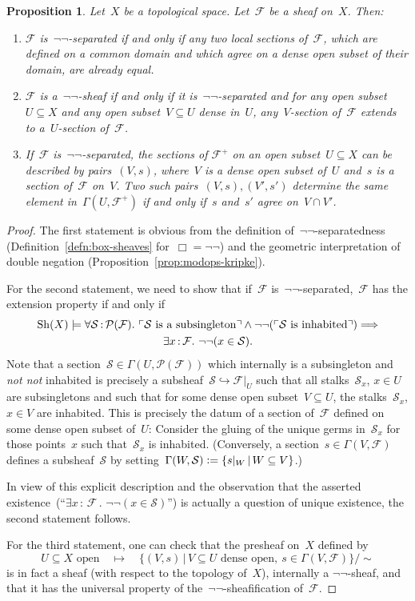 \documentclass[10pt]{amsart}
\theoremstyle{definition}
\theoremstyle{plain}
\newtheorem{prop}[defn]{Proposition}
\theoremstyle{remark}
\newcommand{\F}{\mathcal{F}}
\renewcommand{\P}{\mathcal{P}}
\renewcommand{\S}{\mathcal{S}}
\newcommand{\Sh}{\mathrm{Sh}}
\newcommand{\?}{\,{:}\,}
\renewcommand{\_}{\mathpunct{.}\,}
\newcommand{\speak}[1]{\ulcorner\text{\textnormal{#1}}\urcorner}
\newcommand{\notnot}{\emph{not not}\xspace}
\newcommand{\defeq}{\vcentcolon=}
\begin{document}
\begin{prop}\label{prop:negneg-sheaves}
Let~$X$ be a topological space. Let~$\F$ be a sheaf on~$X$. Then:
\begin{enumerate}
\item $\F$ is~$\neg\neg$-separated if and only if any two local sections
of~$\F$, which are defined on a common domain and which agree on a dense open
subset of their domain, are already equal.
\item $\F$ is a~$\neg\neg$-sheaf if and only if it is~$\neg\neg$-separated and
for any open subset~$U \subseteq X$ and any open subset~$V \subseteq U$ dense
in~$U$, any~$V$-section of~$\F$ extends to a~$U$-section of~$\F$.
\item If~$\F$ is~$\neg\neg$-separated, the sections of $\F^+$ on an open
subset~$U \subseteq X$ can be described by pairs~$(V,s)$, where~$V$ is a dense
open subset of~$U$ and~$s$ is a section of~$\F$ on~$V$. Two such pairs~$(V,s),
(V',s')$ determine the same element in~$\Gamma(U,\F^+)$ if and only if~$s$ and~$s'$
agree on~$V \cap V'$.
\end{enumerate}
\end{prop}
\begin{proof}
The first statement is obvious from the definition of~$\neg\neg$-separatedness
(Definition~\ref{defn:box-sheaves} for~$\Box = \neg\neg$) and the geometric
interpretation of double negation (Proposition~\ref{prop:modops-kripke}).

For the second statement, we need to show that if~$\F$
is~$\neg\neg$-separated,~$\F$ has the extension property if and only if
\begin{multline*}
  \Sh(X) \models \forall \S \? \P(\F)\_
  \speak{$\S$ is a subsingleton} \wedge
  \neg\neg(\speak{$\S$ is inhabited}) \Longrightarrow \\
  \exists x\?\F\_ \neg\neg(x \in \S).
\end{multline*}
Note that a section~$\S \in \Gamma(U,\P(\F))$ which internally is a
subsingleton and \notnot inhabited is precisely a subsheaf~$\S \hookrightarrow
\F|_U$ such that all stalks~$\S_x$, $x \in U$ are subsingletons and such that for
some dense open subset~$V \subseteq U$, the stalks~$\S_x$, $x \in V$ are
inhabited. This is precisely the datum of a section of~$\F$ defined on some
dense open subset of~$U$: Consider the gluing of the unique germs in~$\S_x$ for
those points~$x$ such that~$\S_x$ is inhabited. (Conversely, a section~$s \in
\Gamma(V,\F)$ defines a subsheaf~$\S$ by setting~$\Gamma(W,\S) \defeq \{ s|_W \,|\,
W \subseteq V \}$.)

In view of this explicit description and the observation that the asserted
existence~(``$\exists x\?\F\_ \neg\neg(x \in \S)$'') is actually a question of
unique existence, the second statement follows.

For the third statement, one can check that the presheaf on~$X$ defined by
\[ \text{$U \subseteq X$ open} \quad\longmapsto\quad
  \{ (V,s) \,|\, \text{$V \subseteq U$ dense open},\ s \in \Gamma(V,\F)
  \}/{\sim} \]
is in fact a sheaf (with respect to the topology of~$X$), internally a $\neg\neg$-sheaf,
and that it has the universal property of the~$\neg\neg$-sheafification
of~$\F$.
\end{proof}
\end{document}
